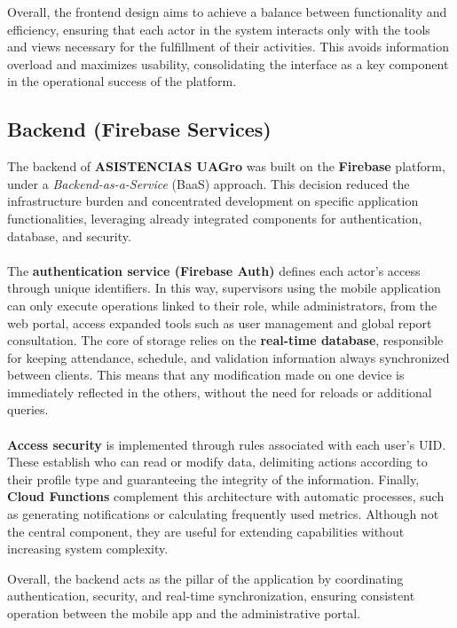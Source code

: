 \documentclass[journal=information,article,submit,pdftex,oneauthor]{Definitions/mdpi}
\begin{document}
Overall, the frontend design aims to achieve a balance between functionality and efficiency, ensuring that each actor in the system interacts only with the tools and views necessary for the fulfillment of their activities. This avoids information overload and maximizes usability, consolidating the interface as a key component in the operational success of the platform.

\subsection{Backend (Firebase Services)}

The backend of \textbf{ASISTENCIAS UAGro} was built on the \textbf{Firebase} platform, under a \textit{Backend-as-a-Service} (BaaS) approach. This decision reduced the infrastructure burden and concentrated development on specific application functionalities, leveraging already integrated components for authentication, database, and security.\\
\\
The \textbf{authentication service (Firebase Auth)} defines each actor's access through unique identifiers. In this way, supervisors using the mobile application can only execute operations linked to their role, while administrators, from the web portal, access expanded tools such as user management and global report consultation. The core of storage relies on the \textbf{real-time database}, responsible for keeping attendance, schedule, and validation information always synchronized between clients. This means that any modification made on one device is immediately reflected in the others, without the need for reloads or additional queries.\\
\\
\textbf{Access security} is implemented through rules associated with each user's UID. These establish who can read or modify data, delimiting actions according to their profile type and guaranteeing the integrity of the information. Finally, \textbf{Cloud Functions} complement this architecture with automatic processes, such as generating notifications or calculating frequently used metrics. Although not the central component, they are useful for extending capabilities without increasing system complexity.

Overall, the backend acts as the pillar of the application by coordinating authentication, security, and real-time synchronization, ensuring consistent operation between the mobile app and the administrative portal.
\end{document}
